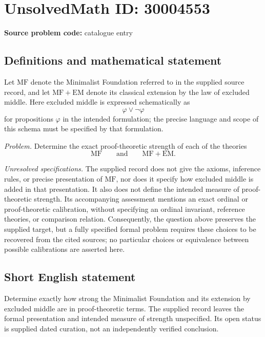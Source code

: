 \documentclass[11pt]{article}
\begin{document}
\section*{UnsolvedMath ID: 30004553}
\textbf{Source problem code:} catalogue entry
\subsection{Definitions and mathematical statement}
Let \(\mathrm{MF}\) denote the Minimalist Foundation referred to in the supplied source record, and let \(\mathrm{MF}+\mathrm{EM}\) denote its classical extension by the law of excluded middle. Here excluded middle is expressed schematically as
\[
\varphi\lor\neg\varphi
\]
for propositions \(\varphi\) in the intended formulation; the precise language and scope of this schema must be specified by that formulation.

\emph{Problem.} Determine the exact proof-theoretic strength of each of the theories
\[
\mathrm{MF}\qquad\text{and}\qquad\mathrm{MF}+\mathrm{EM}.
\]

\emph{Unresolved specifications.} The supplied record does not give the axioms, inference rules, or precise presentation of \(\mathrm{MF}\), nor does it specify how excluded middle is added in that presentation. It also does not define the intended measure of proof-theoretic strength. Its accompanying assessment mentions an exact ordinal or proof-theoretic calibration, without specifying an ordinal invariant, reference theories, or comparison relation. Consequently, the question above preserves the supplied target, but a fully specified formal problem requires these choices to be recovered from the cited sources; no particular choices or equivalence between possible calibrations are asserted here.
\subsection{Short English statement}
Determine exactly how strong the Minimalist Foundation and its extension by excluded middle are in proof-theoretic terms. The supplied record leaves the formal presentation and intended measure of strength unspecified. Its open status is supplied dated curation, not an independently verified conclusion.
\end{document}

